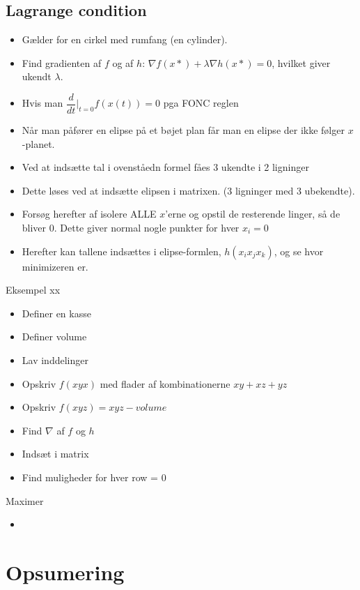 \documentclass[danish, 10pt]{Memoir}
\begin{document}
\subsection*{Lagrange condition}
\begin{itemize}
	\item Gælder for en cirkel med rumfang (en cylinder).
	\item Find gradienten af $f$ og af $h$: $\nabla f(x*) + \lambda \nabla h(x*) = 0$, hvilket giver ukendt $\lambda$.
	\item Hvis man $\dfrac{d}{dt}|_{t=0} f(x(t)) = 0$ pga FONC reglen
	\item Når man påfører en elipse på et bøjet plan får man en elipse der ikke følger $x$-planet.
	\item Ved at indsætte tal i ovenståedn formel fåes 3 ukendte i 2 ligninger
	\item Dette løses ved at indsætte elipsen i matrixen.
	 (3 ligninger med 3 ubekendte).
	 \item Forsøg herefter af isolere ALLE $x$'erne og opstil de resterende linger, så de bliver 0. 
	 Dette giver normal nogle punkter for hver $x_i = 0$
	 \item Herefter kan tallene indsættes i elipse-formlen, $h(x_i x_j x_k)$, og se hvor minimizeren er.
\end{itemize}
Eksempel xx
\begin{itemize}
	\item Definer en kasse
	\item Definer volume
	\item Lav inddelinger
	\item Opskriv $f(x y x)$ med flader af kombinationerne $xy + xz + yz$
	\item Opskriv $f(x y z) = xyz - volume$
	\item Find $\nabla$ af $f$ og $h$
	\item Indsæt i matrix
	\item Find muligheder for hver row = 0
\end{itemize}
Maximer
\begin{itemize}
	\item 
\end{itemize}









\newpage
\section*{Opsumering}
\end{document}
